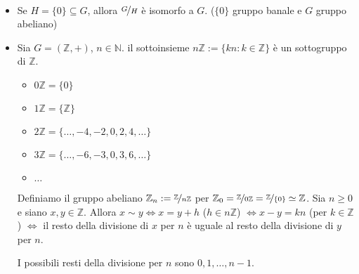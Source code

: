 \documentclass[../main.tex]{subfiles}
\begin{document}
\begin{example}
    \
    \begin{itemize}
        \item Se $H = \{0\} \subseteq G$, allora $\nicefrac{G}{H}$ è isomorfo a $G$. ($\{0\}$ gruppo banale e $G$ gruppo abeliano)
        \item Sia $G = (\mathbb{Z} , +)$, $ n \in \mathbb{N} $. il sottoinsieme $n\mathbb{Z} := \{kn : k \in \mathbb{Z}\}$ è un sottogruppo di $\mathbb{Z}$.
              \begin{itemize}
                  \item $0 \mathbb{Z} = \{0\}$
                  \item $1 \mathbb{Z} = \{\mathbb{Z} \}$
                  \item $2 \mathbb{Z} = \{\ldots,-4,-2,0,2,4,\ldots\}$
                  \item $3 \mathbb{Z} = \{\ldots,-6,-3,0,3,6,\ldots\}$
                  \item $\ldots$
              \end{itemize}
              Definiamo il gruppo abeliano $\mathbb{Z}_n := \nicefrac{\mathbb{Z}}{n\mathbb{Z}}$ per $\mathbb{Z}_0 = \nicefrac{\mathbb{Z}}{0 \mathbb{Z}} = \nicefrac{\mathbb{Z}}{\{0\}} \simeq \mathbb{Z} $. \newline
              Sia $n \geq 0$ e siano $x,y \in \mathbb{Z}$.
              Allora $x \sim y \iff x = y+h$ ($h \in n \mathbb{Z}$) $\iff x-y = kn$ (per $k \in \mathbb{Z}$) $\iff$ il resto della divisione di $x$ per $n$ è uguale al resto  della divisione di $y$ per $n$.

              I possibili resti della divisione per $n$ sono $0,1,\ldots,n-1$.


\end{itemize}
\end{example}
\end{document}
